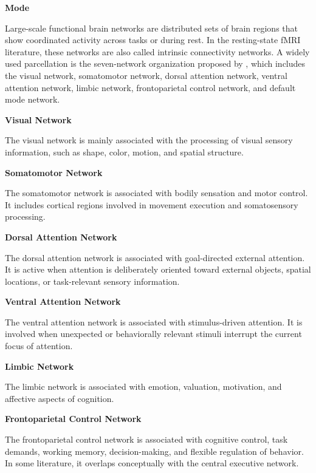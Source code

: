 \documentclass{book}
\providecommand{\ProjectDeepHeading}[2]{%
    \par\medskip\noindent\textbf{#2}\par\smallskip
}
\begin{document}
\ProjectDeepHeading{6}{Mode}


Large-scale functional brain networks are distributed sets of brain regions that show coordinated activity across tasks or during rest. In the resting-state fMRI literature, these networks are also called intrinsic connectivity networks. A widely used parcellation is the seven-network organization proposed by \citet{yeo-2011-the-organization-of-the-human-cerebral-cortex}, which includes the visual network, somatomotor network, dorsal attention network, ventral attention network, limbic network, frontoparietal control network, and default mode network.
    
    
    \ProjectDeepHeading{9}{Visual Network}
        
        The visual network is mainly associated with the processing of visual sensory information, such as shape, color, motion, and spatial structure.
    
    
    \ProjectDeepHeading{9}{Somatomotor Network}
        
        The somatomotor network is associated with bodily sensation and motor control. It includes cortical regions involved in movement execution and somatosensory processing.
    
    
    \ProjectDeepHeading{9}{Dorsal Attention Network}
        
        The dorsal attention network is associated with goal-directed external attention. It is active when attention is deliberately oriented toward external objects, spatial locations, or task-relevant sensory information.
    
    
    \ProjectDeepHeading{9}{Ventral Attention Network}
        
        The ventral attention network is associated with stimulus-driven attention. It is involved when unexpected or behaviorally relevant stimuli interrupt the current focus of attention.
    
    
    \ProjectDeepHeading{9}{Limbic Network}
        
        The limbic network is associated with emotion, valuation, motivation, and affective aspects of cognition.
    
    
    \ProjectDeepHeading{9}{Frontoparietal Control Network}
        
        The frontoparietal control network is associated with cognitive control, task demands, working memory, decision-making, and flexible regulation of behavior. In some literature, it overlaps conceptually with the central executive network.
    
\end{document}
